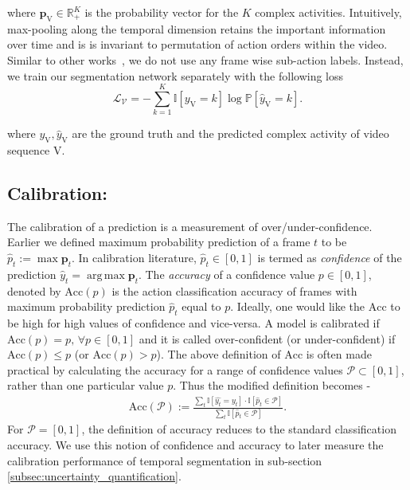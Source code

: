 \documentclass[10pt,twocolumn,letterpaper]{article}
\DeclareMathOperator{\argmax}{\arg\,\max}
\newcommand{\calP}{\mathcal{P}}
\newcommand{\bbR}{\mathbb{R}}
\newcommand{\bbI}{\mathbb{I}}
\newcommand{\bp}{\mathbf{p}}
\newcommand{\acc}{\ensuremath{\text{Acc}}}
\newcommand{\PP}{\ensuremath{\mathbb{P}}}
\newcommand{\sqBK}[1]{ {\left[ #1 \right]} }
\begin{document}
\noindent where $\bp_{\text{V}} \in \bbR^{K}_{+}$ is the probability vector for the $K$ complex activities.  Intuitively, max-pooling along the temporal dimension retains the important information over time and is is invariant to permutation of action orders within the video.
Similar to other works~\cite{highlevel-hussein2019timeception, highlevel-hussein2020pic}, we do not use any frame wise sub-action labels.  Instead, we train our segmentation network separately with the following loss
\begin{equation}
 \mathcal{L_{V}} = - \sum_{k=1}^K \bbI\sqBK{y_{\text{V}} = k} \log \PP\sqBK{\hat{y}_{\text{V}} = k}.
\end{equation}

\noindent where $y_{\text{V}}, \hat{y}_{\text{V}}$ are the ground truth and the predicted complex activity of video sequence $\text{V}$.

\subsection{Calibration:}\label{subsec:calibration_notation}
The calibration of a prediction is a measurement of over/under-confidence. Earlier we defined maximum probability prediction of a frame $t$ to be $\hat{p}_t := \max \bp_t$. In calibration literature, $\hat{p}_t \in [0,1]$ is termed as \textit{confidence} of the prediction $\hat{y}_t = \argmax \bp_t$. The \textit{accuracy} of a confidence value $p \in [0,1]$, denoted by $\acc(p)$ is the action classification accuracy of frames with maximum probability prediction $\hat{p}_t$ equal to $p$. Ideally, one would like the \acc{} to be high for high values of confidence and vice-versa. A model is calibrated if $\acc(p) = p, \,\forall p\in [0,1]$ and it is called over-confident (or under-confident) if $\acc(p)\! \le\!p$ (or $\acc(p)\!>\!p$). 
The above definition of \acc{} is often made practical by calculating the accuracy for a range of confidence values $\calP \subset [0,1]$, rather than one particular value $p$. Thus the modified definition becomes -
\begin{gather*}
    \acc(\calP) := \frac{\sum_t \bbI\sqBK{\hat{y_t} = y_t}\cdot \bbI\sqBK{\hat{p}_t \in \calP}}{\sum_t \bbI\sqBK{\hat{p}_t \in \calP}}.
\end{gather*}
For $\calP = [0,1]$, the definition of accuracy reduces to the standard classification accuracy. We use this notion of confidence and accuracy to later measure the calibration performance of temporal segmentation in sub-section \ref{subsec:uncertainty_quantification}.
\end{document}
